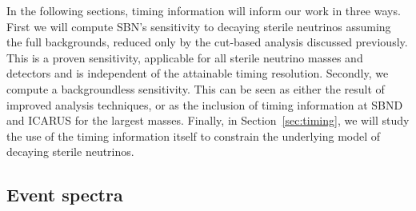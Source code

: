 \documentclass[11pt, a4paper]{article}
\newcommand{\refsec}[1]{Section~\ref{#1}}
\def\muboone{MicroBooNE}
\begin{document}
In the following sections, timing information will inform our work in three
ways. First we will compute SBN's sensitivity to decaying sterile neutrinos assuming the
full backgrounds, reduced only by the cut-based analysis discussed previously.
This is a proven sensitivity, applicable for all sterile neutrino masses and detectors
and is independent of the attainable timing resolution. Secondly, we compute a
backgroundless sensitivity. This can be seen as either the result of improved
analysis techniques, or as the inclusion of timing information at SBND and
ICARUS for the largest masses. Finally, in \refsec{sec:timing}, we will study
the use of the timing information itself to constrain the underlying model of
decaying sterile neutrinos.

%
%

\subsection{\label{sec:eventspectra}Event spectra}
\end{document}
